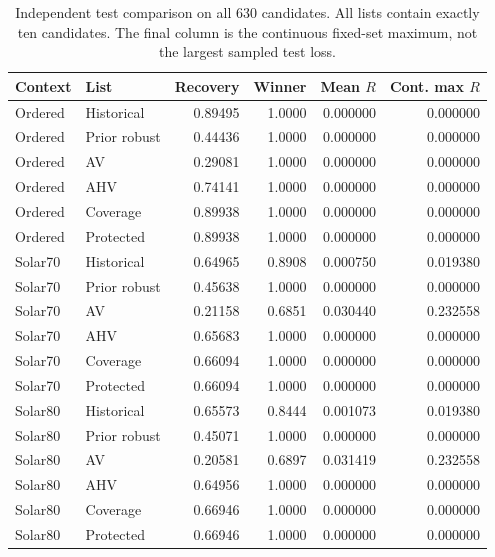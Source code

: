 \begin{table}[tbp]\centering\small\caption{Independent test comparison on all 630 candidates. All lists contain exactly ten candidates. The final column is the continuous fixed-set maximum, not the largest sampled test loss.}\label{tab:comparison1}
\begin{tabular}{llrrrr}\toprule
Context & List & Recovery & Winner & Mean $R$ & Cont. max $R$\\\midrule
Ordered & Historical & 0.89495 & 1.0000 & 0.000000 & 0.000000\\
Ordered & Prior robust & 0.44436 & 1.0000 & 0.000000 & 0.000000\\
Ordered & AV & 0.29081 & 1.0000 & 0.000000 & 0.000000\\
Ordered & AHV & 0.74141 & 1.0000 & 0.000000 & 0.000000\\
Ordered & Coverage & 0.89938 & 1.0000 & 0.000000 & 0.000000\\
Ordered & Protected & 0.89938 & 1.0000 & 0.000000 & 0.000000\\
Solar70 & Historical & 0.64965 & 0.8908 & 0.000750 & 0.019380\\
Solar70 & Prior robust & 0.45638 & 1.0000 & 0.000000 & 0.000000\\
Solar70 & AV & 0.21158 & 0.6851 & 0.030440 & 0.232558\\
Solar70 & AHV & 0.65683 & 1.0000 & 0.000000 & 0.000000\\
Solar70 & Coverage & 0.66094 & 1.0000 & 0.000000 & 0.000000\\
Solar70 & Protected & 0.66094 & 1.0000 & 0.000000 & 0.000000\\
Solar80 & Historical & 0.65573 & 0.8444 & 0.001073 & 0.019380\\
Solar80 & Prior robust & 0.45071 & 1.0000 & 0.000000 & 0.000000\\
Solar80 & AV & 0.20581 & 0.6897 & 0.031419 & 0.232558\\
Solar80 & AHV & 0.64956 & 1.0000 & 0.000000 & 0.000000\\
Solar80 & Coverage & 0.66946 & 1.0000 & 0.000000 & 0.000000\\
Solar80 & Protected & 0.66946 & 1.0000 & 0.000000 & 0.000000\\
\bottomrule\end{tabular}\end{table}
